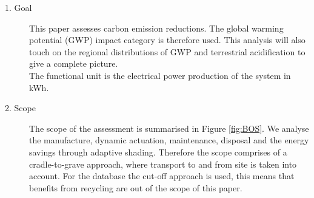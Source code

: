 \begin{description}
\item[1. Goal] This paper assesses carbon emission reductions. The global warming potential (GWP) impact category is therefore used. This analysis will also touch on the regional distributions of GWP and terrestrial acidification to give a complete picture.\\

The functional unit is the electrical power production of the system in kWh. 


\item[2. Scope] The scope of the assessment is summarised in Figure \ref{fig:BOS}. We analyse the  manufacture, dynamic actuation, maintenance, disposal and the energy savings through adaptive shading. Therefore the scope comprises of a cradle-to-grave approach, where transport to and from site is taken into account. For the database the cut-off approach is used, this means that benefits from recycling are out of the scope of this paper.







\end{description}
